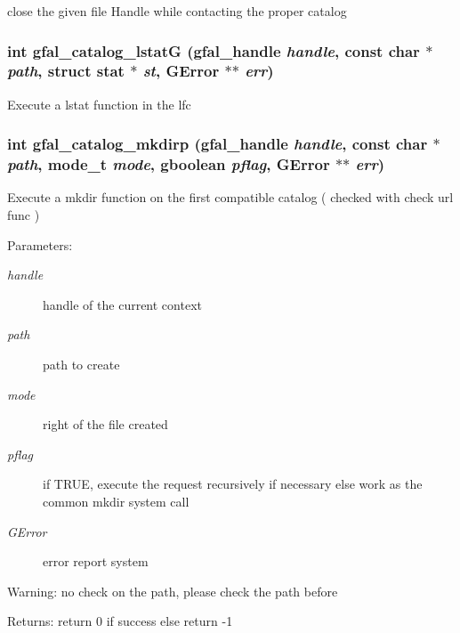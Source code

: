 close the given file Handle while contacting the proper catalog 
\subsubsection{\setlength{\rightskip}{0pt plus 5cm}int gfal\_\-catalog\_\-lstat\-G (gfal\_\-handle {\em handle}, const char $\ast$ {\em path}, struct stat $\ast$ {\em st}, GError $\ast$$\ast$ {\em err})}\label{gfal__common__catalog_8c_1ad1b1f96272dbf43a15e7ea5d35389d}


Execute a lstat function in the lfc 
\subsubsection{\setlength{\rightskip}{0pt plus 5cm}int gfal\_\-catalog\_\-mkdirp (gfal\_\-handle {\em handle}, const char $\ast$ {\em path}, mode\_\-t {\em mode}, gboolean {\em pflag}, GError $\ast$$\ast$ {\em err})}\label{gfal__common__catalog_8c_93da9b37bece0b034d80c17131761110}


Execute a mkdir function on the first compatible catalog ( checked with check url func ) \begin{Desc}
\item[Parameters:]
\begin{description}
\item[{\em handle}]handle of the current context \item[{\em path}]path to create \item[{\em mode}]right of the file created \item[{\em pflag}]if TRUE, execute the request recursively if necessary else work as the common mkdir system call \item[{\em GError}]error report system \end{description}
\end{Desc}
\begin{Desc}
\item[Warning:]no check on the path, please check the path before \end{Desc}
\begin{Desc}
\item[Returns:]return 0 if success else return -1 \end{Desc}
